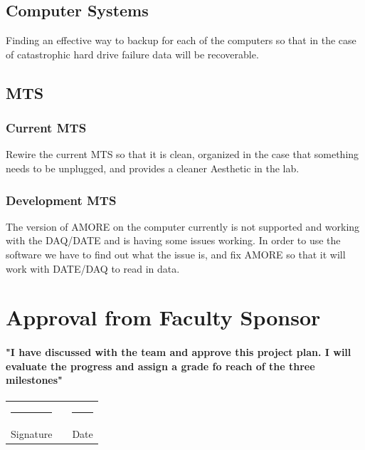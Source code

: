 \documentclass[12pt]{article}
\newcommand\tab[1][1cm]{\hspace*{#1}}
\newcommand{\doubleSignature}[2]{
	\begin{center}
		
	\end{center}
	\vspace{2cm}
	
	\noindent
	\begin{tabular}{lcl}
		\rule{7cm}{1pt} & \hspace{2cm} & \rule{3cm}{1pt} \\
		#1 & & #2
	\end{tabular}
	\vspace{1cm}
}
\begin{document}
\subsection{Computer Systems}
\tab Finding an effective way to backup for each of the computers so that in the case of catastrophic hard drive failure data will be recoverable. 
\subsection{MTS}
\subsubsection{Current MTS}
\tab Rewire the current MTS so that it is clean, organized in the case that something needs to be unplugged, and provides a cleaner Aesthetic in the lab. 
\subsubsection{Development MTS}
\tab The version of AMORE on the computer currently is not supported and working with the DAQ/DATE and is having some issues working. In order to use the software we have to find out what the issue is, and fix AMORE so that it will work with DATE/DAQ to read in data. 

\section{Approval from Faculty Sponsor}
\paragraph{\tab "I have discussed with the team and approve this project plan. I will evaluate the progress and assign a grade fo reach of the three milestones"}
\doubleSignature{Signature}{Date}
\end{document}
